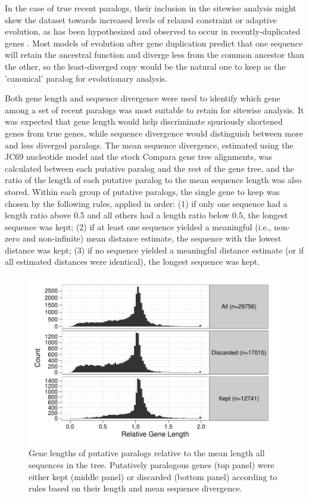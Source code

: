 In the case of true recent paralogs, their inclusion in the sitewise
analysis might skew the dataset towards increased levels of relaxed
constraint or adaptive evolution, as has been hypothesized and
observed to occur in recently-duplicated genes \citep{Lynch2000}. Most
models of evolution after gene duplication predict that one sequence
will retain the ancestral function and diverge less from the common
ancestor than the other, so the least-diverged copy would be the
natural one to keep as the 'canonical' paralog for evolutionary
analysis.

Both gene length and sequence divergence were used to identify which
gene among a set of recent paralogs was most suitable to retain for
sitewise analysis. It was expected that gene length would help
discriminate spuriously shortened genes from true genes, while
sequence divergence would distinguish between more and less diverged
paralogs. The mean sequence divergence, estimated using the JC69
nucleotide model and the stock Compara gene tree alignments, was
calculated between each putative paralog and the rest of the gene
tree, and the ratio of the length of each putative paralog to the mean
sequence length was also stored. Within each group of putative
paralogs, the single gene to keep was chosen by the following rules,
applied in order: (1) if only one sequence had a length ratio above
0.5 and all others had a length ratio below 0.5, the longest sequence
was kept; (2) if at least one sequence yielded a meaningful (i.e.,
non-zero and non-infinite) mean distance estimate, the sequence with
the lowest distance was kept; (3) if no sequence yielded a meaningful
distance estimate (or if all estimated distances were identical), the
longest sequence was kept.

\begin{figure}
\centering
\includegraphics[scale=0.7]{Figs/filtered_paralogs_hist.pdf}
\caption{Gene lengths of putative paralogs relative to the mean length
  all sequences in the tree. Putatively paralogous genes (top panel)
  were either kept (middle panel) or discarded (bottom panel)
  according to rules based on their length and mean sequence
  divergence.}
\label{filtered_paralogs_hist}
\end{figure}

